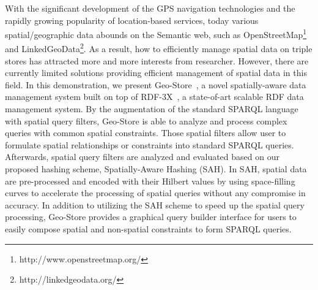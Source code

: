 With the significant development of the GPS navigation technologies and the rapidly growing popularity of location-based services, today various spatial/geographic data abounds on the Semantic web, such as OpenStreetMap\footnote{http://www.openstreetmap.org/} and LinkedGeoData\footnote{http://linkedgeodata.org/}. As a result, how to efficiently manage spatial data on triple stores has attracted more and more interests from researcher. However, there are currently limited solutions providing efficient management of spatial data in this field. In this demonstration, we present Geo-Store~\cite{journals/internet/KuCWL}, a novel spatially-aware data management system built on top of RDF-3X~\cite{DBLP:journals/vldb/NeumannW10}, a state-of-art scalable RDF data management system. By the augmentation of the standard SPARQL language with spatial query filters, Geo-Store is able to analyze and process complex queries with common spatial constraints. Those spatial filters allow user to formulate spatial relationships or constraints into standard SPARQL queries. Afterwards, spatial query filters are analyzed and evaluated based on our proposed hashing scheme, Spatially-Aware Hashing (SAH). In SAH, spatial data are pre-processed and encoded with their Hilbert values by using space-filling curves to accelerate the processing of spatial queries without any compromise in accuracy. In addition to utilizing the SAH scheme to speed up the spatial query processing, Geo-Store provides a graphical query builder interface for users to easily compose spatial and non-spatial constraints to form SPARQL queries.  